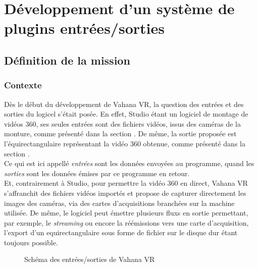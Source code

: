 \chapter{Développement d'un système de plugins entrées/sorties}

\section{Définition de la mission}
\subsection{Contexte}
Dès le début du développement de Vahana VR, la question des entrées et des sorties
du logicel s'était posée. En effet, Studio étant un logiciel de montage de vidéos
360, ses seules entrées sont des fichiers vidéos, issus des caméras de la monture,
comme présenté dans la section . De même, la sortie proposée 
est l'équirectangulaire représentant la vidéo 360 obtenue, comme présenté dans la section .\\
Ce qui est ici appellé \emph{entrées} sont les données envoyées au programme, quand
les \emph{sorties} sont les données émises par ce programme en retour.\\
Et, contrairement à Studio, pour permettre la vidéo 360 en direct, Vahana VR s'affranchit des fichiers
vidéos importés et propose de capturer directement les images des caméras, via
des cartes d'acquisitions branchées sur la machine utilisée. De même, le logiciel peut émettre 
plusieurs fluxs en sortie permettant, par exemple, le \textit{streaming} ou encore la réémissions vers
une carte d'acquisition, l'export d'un equirectangulaire sous forme de fichier
sur le disque dur étant toujours possible.\\
\begin{figure}
  \centering
  \caption{Schéma des entrées/sorties de Vahana VR}
\end{figure}

